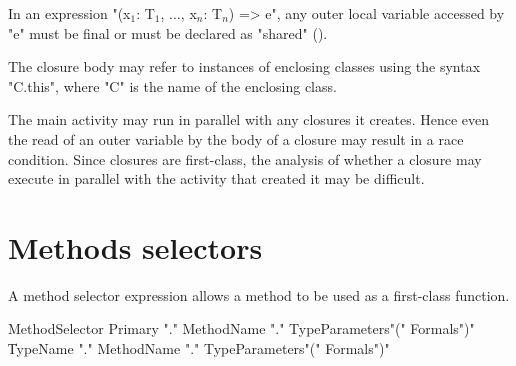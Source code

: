 \begin{staticrule*}
In an expression
\xcdmath"(x$_1$: T$_1$, $\dots$, x$_n$: T$_n$) => e",
any outer local variable accessed by \xcd"e" must be final or
must be declared
as \xcd"shared" ().
\end{staticrule*}

The closure body may refer to instances of enclosing classes using
the syntax \xcd"C.this", where \xcd"C" is the name of the
enclosing class.

\begin{note}
The main activity may run in parallel with any
closures it creates. Hence even the read of an outer variable by the
body of a closure may result in a race condition. Since closures are
first-class, the analysis of whether a closure may execute in parallel
with the activity that created it may be difficult.
\end{note}


\section{Methods selectors}
\label{MethodSelectors}

A method selector expression allows a method to be used as a
first-class function.

\begin{grammar}
MethodSelector \:
        Primary \xcd"."
        MethodName \xcd"."
                TypeParameters\opt \xcd"(" Formals\opt \xcd")" \\
      \|
        TypeName \xcd"."
        MethodName \xcd"."
                TypeParameters\opt \xcd"(" Formals\opt \xcd")" \\
\end{grammar}

